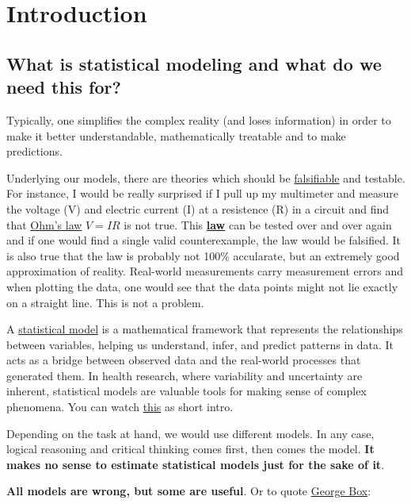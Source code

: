 \documentclass[
]{book}
\begin{document}
\chapter{Introduction}\label{intro}

\section{What is statistical modeling and what do we need this for?}\label{what-is-statistical-modeling-and-what-do-we-need-this-for}

Typically, one simplifies the complex reality (and loses information) in order to make it better
understandable, mathematically treatable and to make predictions.

Underlying our models, there are theories which should be \href{https://en.wikipedia.org/wiki/Falsifiability}{falsifiable}
and testable.
For instance, I would be really surprised if I pull up my multimeter and measure the voltage (V) and
electric current (I) at a resistence (R) in a circuit and find that \href{https://en.wikipedia.org/wiki/Ohm\%27s_law}{Ohm's law} \(V = IR\) is not true.
This \href{https://en.wikipedia.org/wiki/Scientific_law}{\textbf{law}}
can be tested over and over again and if one would find a single valid counterexample,
the law would be falsified. It is also true that the law is probably not 100\% accularate,
but an extremely good approximation of reality. Real-world measurements carry
measurement errors and when plotting the data, one would see that the data points
might not lie exactly on a straight line. This is not a problem.

A \href{https://en.wikipedia.org/wiki/Statistical_model}{statistical model}
is a mathematical framework that represents the
relationships between variables, helping us understand, infer, and
predict patterns in data. It acts as a bridge between observed data
and the real-world processes that generated them. In health research,
where variability and uncertainty are inherent, statistical models are
valuable tools for making sense of complex phenomena.
You can watch \href{https://www.youtube.com/watch?v=3d5ivs_8amQ&ab_channel=VeryNormal}{this} as short intro.

Depending on the task at hand, we would use different models.
In any case, logical reasoning and critical thinking comes first,
then comes the model. \textbf{It makes no sense to estimate statistical models just for the sake of it}.

\textbf{All models are wrong, but some are useful}.
Or to quote \href{https://www.tandfonline.com/doi/abs/10.1080/01621459.1976.10480949}{George Box}:
\end{document}
